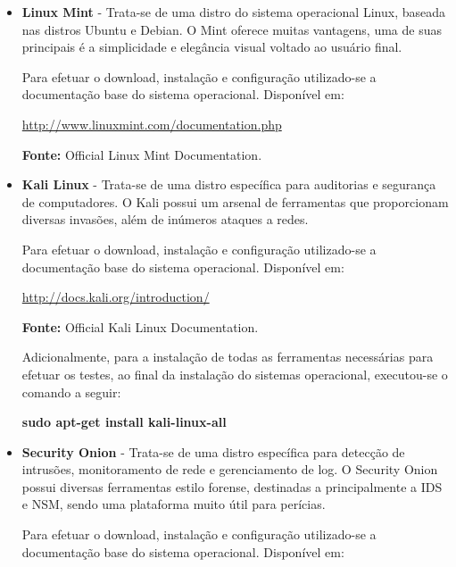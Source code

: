 			\begin{itemize}
				
				\item \textbf{Linux Mint} - Trata-se de uma distro do sistema operacional Linux, baseada nas distros Ubuntu e Debian. O Mint oferece muitas vantagens, uma de suas principais é a simplicidade e elegância visual voltado ao usuário final. \cite{mint}

				Para efetuar o download, instalação e configuração utilizado-se a documentação base do sistema operacional. Disponível em:

				\begin{framed}
					\href{http://www.linuxmint.com/documentation.php}{http://www.linuxmint.com/documentation.php}
				\end{framed}
				\textbf{Fonte:} Official Linux Mint Documentation.
				

				\item \textbf{Kali Linux} - Trata-se de uma distro específica para auditorias e segurança de computadores. O Kali possui um arsenal de ferramentas que proporcionam diversas invasões, além de inúmeros ataques a redes. \cite{kali}

				Para efetuar o download, instalação e configuração utilizado-se a documentação base do sistema operacional. Disponível em:

				\begin{framed}
					\href{http://docs.kali.org/introduction/}{http://docs.kali.org/introduction/}
				\end{framed}
				\textbf{Fonte:} Official Kali Linux Documentation.

				Adicionalmente, para a instalação de todas as ferramentas necessárias para efetuar os testes, ao final da instalação do sistemas operacional, executou-se o comando a seguir:

				\begin{framed}
					\textbf{sudo apt-get install kali-linux-all}
				\end{framed}


				\item \textbf{Security Onion} - Trata-se de uma distro específica para detecção de intrusões, monitoramento de rede e gerenciamento de log. O Security Onion possui diversas ferramentas estilo forense, destinadas a principalmente a IDS e NSM, sendo uma plataforma muito útil para perícias. \cite{SO}

				Para efetuar o download, instalação e configuração utilizado-se a documentação base do sistema operacional. Disponível em:


\end{itemize}
